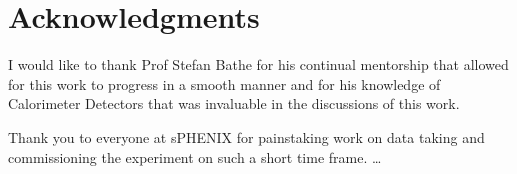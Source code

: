 \chapter*{Acknowledgments}
I would like to thank Prof Stefan Bathe for his continual mentorship that allowed for this work to progress in a smooth manner and for his knowledge of Calorimeter Detectors that was invaluable in the discussions of this work. 

Thank you to everyone at sPHENIX for painstaking work on data taking and commissioning the experiment on such a short time frame. \ldots  
